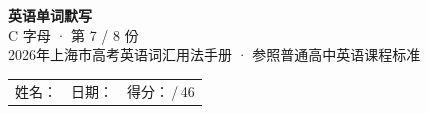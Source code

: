 \documentclass[10pt,a4paper]{article}
\begin{document}
\pagestyle{plain}

\begin{center}
{\LARGE\bfseries 英语单词默写}\\[0.22em]
{\large C 字母 · 第 7 / 8 份}\\[0.18em]
{\small 2026年上海市高考英语词汇用法手册 · 参照普通高中英语课程标准}
\end{center}

\vspace{0.25em}
\noindent\begin{tabular}{@{}p{}@{}p{}@{}p{}@{}}
姓名：\underline{\hspace{2.0cm}} & 日期：\underline{\hspace{2.0cm}} & 得分：\underline{\hspace{1.3cm}}\,/\,46 \\
\end{tabular}

\vspace{0.3em}

\vspace{0.08em}
\end{document}
